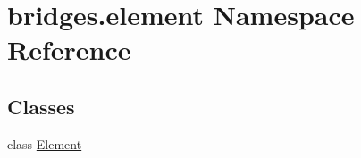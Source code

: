 \hypertarget{namespacebridges_1_1element}{}\section{bridges.\+element Namespace Reference}
\label{namespacebridges_1_1element}
\subsection*{Classes}
\begin{DoxyCompactItemize}
\item 
class \hyperlink{classbridges_1_1element_1_1_element}{Element}
\end{DoxyCompactItemize}
